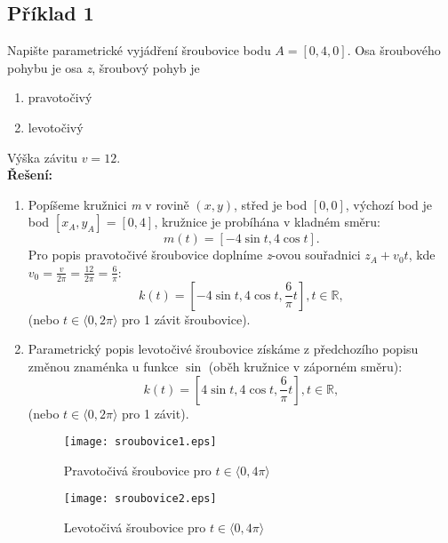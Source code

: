 \subsection*{Příklad 1}
Napište parametrické vyjádření šroubovice bodu $A=[0,4,0]$. Osa šroubového pohybu je osa \textit{z}, šroubový pohyb je
\begin{enumerate}
	\item pravotočivý
	\item levotočivý
\end{enumerate}
Výška závitu $v=12$. \\[10pt]
\textbf{Řešení: } \\
\begin{enumerate}
	\item Popíšeme kružnici \textit{m} v rovině $(x,y)$, střed je bod $[0,0]$, výchozí bod je bod $[x_A, y_A]=[0,4]$, kružnice je probíhána v kladném směru:
	      $$m(t) = \left[-4\sin{t}, 4\cos{t}\right].$$
	      Pro popis pravotočivé šroubovice doplníme \textit{z}-ovou souřadnici $z_A+v_0t$, kde $v_0=\frac{v}{2\pi}=\frac{12}{2\pi}=\frac{6}{\pi}$:
	      $$k(t) = \left[-4\sin{t}, 4\cos{t}, \frac{6}{\pi}t\right], t \in \mathbb{R},$$
	      (nebo $t \in \langle0, 2\pi\rangle$ pro 1 závit šroubovice).
	\item Parametrický popis levotočivé šroubovice získáme z předchozího popisu změnou znaménka u funkce $\sin$ (oběh kružnice v záporném směru):
	      $$k(t) = \left[4\sin{t}, 4\cos{t}, \frac{6}{\pi}t\right], t \in \mathbb{R},$$
	      (nebo $t \in \langle0, 2\pi\rangle$ pro 1 závit). 	
	      \clearpage
	      \begin{figure}[H]
	      	\centering
	      	\texttt{[image: sroubovice1.eps]}
	      	\caption{Pravotočivá šroubovice pro $t \in \langle0, 4\pi\rangle$}
	      \end{figure}	
	      \begin{figure}[H]
	      	\centering
	      	\texttt{[image: sroubovice2.eps]}
	      	\caption{Levotočivá šroubovice pro $t \in \langle0, 4\pi\rangle$}
	      	
	      \end{figure}	 	
\end{enumerate}
\clearpage
